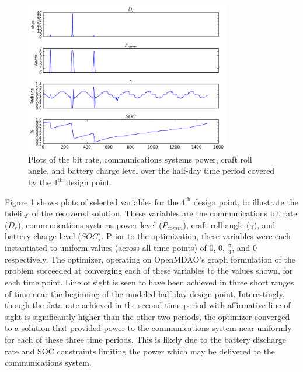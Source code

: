 \documentclass[]{aiaa-tc} %
\begin{document}
        \begin{figure}
        \centering
        \includegraphics[width=0.8\textwidth]{images/pt_3_data}
        \caption[width=0.4\textwidth]{Plots of the bit rate, communications systems power, craft roll angle,
        and battery charge level over the half-day time period covered by the $4^{\textrm{th}}$ design point.
        \label{pt3_data_results}
        }
        \end{figure}

        Figure \ref{pt3_data_results} shows plots of selected variables for the $4^{\textrm{th}}$ design point,
        to illustrate the fidelity of the recovered solution. These variables are the communications
        bit rate ($D_r$), communications systems power level ($P_{comm}$), craft roll angle ($\gamma$),
        and battery charge level ($SOC$). Prior to the optimization, these variables
        were each instantiated to uniform values
        (across all time points) of 0, 0, $\frac{\pi}{4}$, and 0 respectively. The optimizer, operating on
        OpenMDAO's graph formulation of the problem succeeded at converging each of these variables to the values
        shown, for each time point. Line of sight is seen to have been achieved in three short ranges of time near the
        beginning of the modeled half-day design point. Interestingly, though the data rate achieved in the second
        time period with affirmative line of sight is significantly higher than the other two periods, the optimizer
        converged to a solution that provided power to the communications system near uniformly for each of these
        three time periods. This is likely due to the battery discharge rate and SOC constraints limiting
        the power which may be delivered to the communications system.
\end{document}
